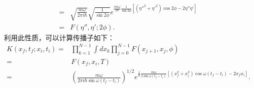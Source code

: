 \documentclass[reqno,a4paper,12pt]{amsart}
\begin{document}
\begin{tcolorbox}[breakable, colback = black!5!white, colframe = black]
\begin{align*}
	=& \sqrt{\frac{m\omega}{2\pi i\hbar}} \sqrt{\frac{1}{\sin2\phi}} e^{\frac{im\omega}{2\hbar} \frac{1}{\sin2\phi} [(\eta''^2+\eta'^2)\cos2\phi - 2\eta''\eta']} \\
	=& F(\eta'', \eta'; 2\phi).
\end{align*}
利用此性质，可以计算传播子如下：
\begin{align*}
	K(x_f, t_f; x_i, t_i) =& \prod_{k=1}^{N-1} \int dx_k \prod_{j=0}^{N-1} F(x_{j+1}, x_j, \phi) \\
	=& F(x_f, x_i, T) \\
	=& \left( \frac{m\omega}{2\pi i\hbar \sin\omega(t_f-t_i)} \right)^{1/2} e^{\frac{i}{\hbar} \frac{m\omega}{2\sin\omega(t_f-t_i)} [(x_f^2+x_i^2)\cos\omega(t_f-t_i) - 2x_fx_i]}.
\end{align*}

\end{tcolorbox}
\end{document}
